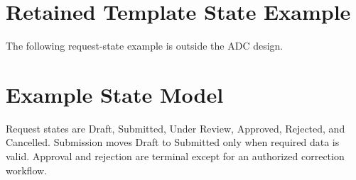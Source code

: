\section{Retained Template State Example}
The following request-state example is outside the ADC design.
\section{Example State Model}
Request states are Draft, Submitted, Under Review, Approved, Rejected, and Cancelled. Submission moves Draft to Submitted only when required data is valid. Approval and rejection are terminal except for an authorized correction workflow.
